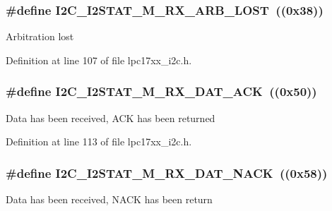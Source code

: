 \subsubsection[{\texorpdfstring{I2\+C\+\_\+\+I2\+S\+T\+A\+T\+\_\+\+M\+\_\+\+R\+X\+\_\+\+A\+R\+B\+\_\+\+L\+O\+ST}{I2C_I2STAT_M_RX_ARB_LOST}}]{\setlength{\rightskip}{0pt plus 5cm}\#define I2\+C\+\_\+\+I2\+S\+T\+A\+T\+\_\+\+M\+\_\+\+R\+X\+\_\+\+A\+R\+B\+\_\+\+L\+O\+ST~((0x38))}\hypertarget{group___i2_c___private___macros_gaed32dea40cf84a1efb09e0c389579163}{}\label{group___i2_c___private___macros_gaed32dea40cf84a1efb09e0c389579163}
Arbitration lost 

Definition at line 107 of file lpc17xx\+\_\+i2c.\+h.

\subsubsection[{\texorpdfstring{I2\+C\+\_\+\+I2\+S\+T\+A\+T\+\_\+\+M\+\_\+\+R\+X\+\_\+\+D\+A\+T\+\_\+\+A\+CK}{I2C_I2STAT_M_RX_DAT_ACK}}]{\setlength{\rightskip}{0pt plus 5cm}\#define I2\+C\+\_\+\+I2\+S\+T\+A\+T\+\_\+\+M\+\_\+\+R\+X\+\_\+\+D\+A\+T\+\_\+\+A\+CK~((0x50))}\hypertarget{group___i2_c___private___macros_ga2f07d3cfad351ba3c976d629db20cea2}{}\label{group___i2_c___private___macros_ga2f07d3cfad351ba3c976d629db20cea2}
Data has been received, A\+CK has been returned 

Definition at line 113 of file lpc17xx\+\_\+i2c.\+h.

\subsubsection[{\texorpdfstring{I2\+C\+\_\+\+I2\+S\+T\+A\+T\+\_\+\+M\+\_\+\+R\+X\+\_\+\+D\+A\+T\+\_\+\+N\+A\+CK}{I2C_I2STAT_M_RX_DAT_NACK}}]{\setlength{\rightskip}{0pt plus 5cm}\#define I2\+C\+\_\+\+I2\+S\+T\+A\+T\+\_\+\+M\+\_\+\+R\+X\+\_\+\+D\+A\+T\+\_\+\+N\+A\+CK~((0x58))}\hypertarget{group___i2_c___private___macros_ga9cc5203175775bfa5ae6df5d6d98b014}{}\label{group___i2_c___private___macros_ga9cc5203175775bfa5ae6df5d6d98b014}
Data has been received, N\+A\+CK has been return 

